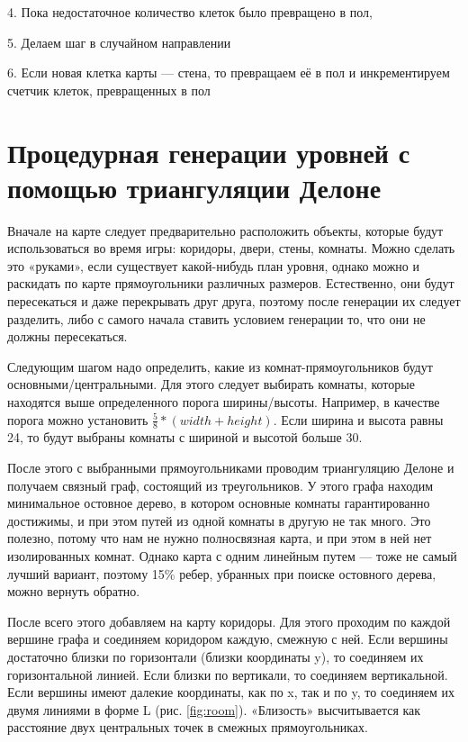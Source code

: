 \documentclass[a4paper,12pt]{report}
\theoremstyle{remark}
\begin{document}
4. Пока недостаточное количество клеток было превращено в пол,

5. Делаем шаг в случайном направлении

6. Если новая клетка карты — стена, то превращаем её в пол и инкрементируем счетчик клеток, превращенных в пол

\section{Процедурная генерации уровней с помощью триангуляции Делоне}

Вначале на карте следует предварительно расположить объекты, которые будут использоваться во время игры: коридоры, двери, стены, комнаты. Можно сделать это «руками», если существует какой-нибудь план уровня, однако можно и раскидать по карте прямоугольники различных размеров. Естественно, они будут пересекаться и даже перекрывать друг друга, поэтому после генерации их следует разделить, либо с самого начала ставить условием генерации то, что они не должны пересекаться.

Следующим шагом надо определить, какие из комнат-прямоугольников будут основными/центральными. Для этого следует выбирать комнаты, которые находятся выше определенного порога ширины/высоты. Например, в качестве порога можно установить $\frac{5}{8}*(width + height)$. Если ширина и высота равны 24, то будут выбраны комнаты с шириной и высотой больше 30.

После этого с выбранными прямоугольниками проводим триангуляцию Делоне\citep{room} и получаем связный граф, состоящий из треугольников. У этого графа находим минимальное остовное дерево, в котором основные комнаты гарантированно достижимы, и при этом путей из одной комнаты в другую не так много. Это полезно, потому что нам не нужно полносвязная карта, и при этом в ней нет изолированных комнат. Однако карта с одним линейным путем — тоже не самый лучший вариант, поэтому 15\% ребер, убранных при поиске остовного дерева, можно вернуть обратно.

После  всего этого добавляем на карту коридоры. Для этого проходим по каждой вершине графа и соединяем коридором каждую, смежную с ней. Если вершины достаточно близки по горизонтали (близки координаты y), то соединяем их горизонтальной линией. Если близки по вертикали, то соединяем вертикальной. Если вершины имеют далекие координаты, как по x, так и по y, то соединяем их двумя линиями в форме L (рис. \ref{fig:room})\citep{room}. «Близость» высчитывается как расстояние двух центральных точек в смежных прямоугольниках.
\end{document}
